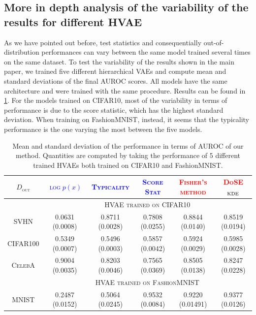 {\subsection{More in depth analysis of the variability of the results for different HVAE}
As we have pointed out before, test statistics and consequentially out-of-distribution performances can vary between the same model trained several times on the same dataset. To test the variability of the results shown in the main paper, we trained five different hierarchical VAEs and compute mean and standard deviations of the final AUROC scores. All models have the same architecture and were trained with the same procedure. Results can be found in \cref{table:consistency_results}. For the models trained on CIFAR10, most of the variability in terms of performance is due to the score statistic, which has the highest standard deviation. When training on FashionMNIST, instead, it seems that the typicality performance is the one varying the most between the five models.

\begin{table}[tb]
    \caption{Mean and standard deviation of the performance in terms of AUROC of our method. Quantities are computed by taking the performance of 5 different trained HVAEs both trained on CIFAR10 and FashionMNIST.}
        \centering
        \scriptsize
        \begin{tabular}{cccccc}
            \toprule
            \textsc{$D_{\text{out}}$}  & \textcolor{blue}{\textsc{$\log p(x)$}} & \textcolor{blue}{\textsc{Typicality}} & \textcolor{blue}{\textsc{Score Stat}} & \textcolor{red}{\textsc{Fisher's method}} & \textcolor{red}{\textsc{DoSE$_{\textup{KDE}}$}}  \\
            \midrule
            &\multicolumn{5}{c}{\textsc{HVAE trained on CIFAR10}} \\
            \cmidrule{2-6}
            \textsc{SVHN} & 0.0631 (0.0008) & 0.8711 (0.0028)  & 0.7808 (0.0255) & 0.8844 (0.0140)  & 0.8519 (0.0194)\\
            \textsc{CIFAR100} & 0.5349 (0.0007) & 0.5496 (0.0003)  & 0.5857 (0.0042) & 0.5924 (0.0029)  & 0.5985 (0.0028)\\
            \textsc{CelebA} & 0.9004 (0.0035) & 0.8203 (0.0046) & 0.7565 (0.0369) & 0.8505 (0.0138) & 0.8247 (0.0228)\\
            \cmidrule{2-6}
            &\multicolumn{5}{c}{\textsc{HVAE trained on FashionMNIST}} \\
            \cmidrule{2-6}%
            \textsc{MNIST} & 0.2487 (0.0152) & 0.5064 (0.0245) & 0.9532 (0.0084) & 0.9220 (0.01491) & 0.9377 (0.0126)\\
            \bottomrule%
    \end{tabular}
    \label{table:consistency_results}
\end{table}


}
